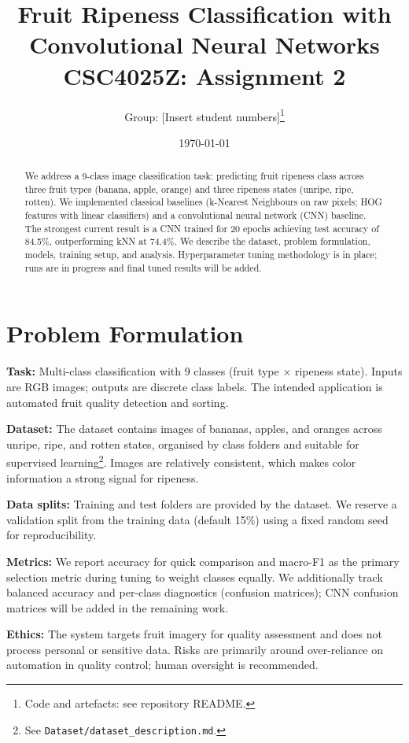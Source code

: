 \documentclass[11pt,a4paper]{article}
\title{Fruit Ripeness Classification with Convolutional Neural Networks\\\large CSC4025Z: Assignment 2}
\author{Group: [Insert student numbers]\thanks{Code and artefacts: see repository README.}}
\date{\today}
\begin{document}
\maketitle

\begin{abstract}
We address a 9-class image classification task: predicting fruit ripeness class across three fruit types (banana, apple, orange) and three ripeness states (unripe, ripe, rotten). We implemented classical baselines (k-Nearest Neighbours on raw pixels; HOG features with linear classifiers) and a convolutional neural network (CNN) baseline. The strongest current result is a CNN trained for 20 epochs achieving test accuracy of 84.5\%, outperforming kNN at 74.4\%. We describe the dataset, problem formulation, models, training setup, and analysis. Hyperparameter tuning methodology is in place; runs are in progress and final tuned results will be added.
\end{abstract}

\section{Problem Formulation}
\textbf{Task:} Multi-class classification with 9 classes (fruit type \(\times\) ripeness state). Inputs are RGB images; outputs are discrete class labels. The intended application is automated fruit quality detection and sorting.

\textbf{Dataset:} The dataset contains images of bananas, apples, and oranges across unripe, ripe, and rotten states, organised by class folders and suitable for supervised learning\footnote{See \texttt{Dataset/dataset\_description.md}.}. Images are relatively consistent, which makes color information a strong signal for ripeness.

\textbf{Data splits:} Training and test folders are provided by the dataset. We reserve a validation split from the training data (default 15\%) using a fixed random seed for reproducibility.

\textbf{Metrics:} We report accuracy for quick comparison and macro-F1 as the primary selection metric during tuning to weight classes equally. We additionally track balanced accuracy and per-class diagnostics (confusion matrices); CNN confusion matrices will be added in the remaining work.

\textbf{Ethics:} The system targets fruit imagery for quality assessment and does not process personal or sensitive data. Risks are primarily around over-reliance on automation in quality control; human oversight is recommended.
\end{document}
